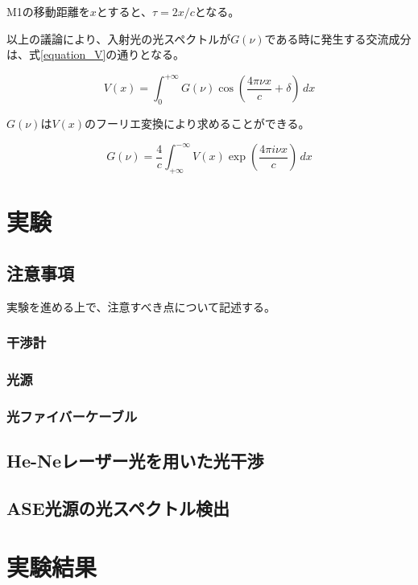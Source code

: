 \documentclass[uplatex, titlepage, fontsize=10pt, paper=a4paper]{jsarticle}
\numberwithin{equation}{section}
\begin{document}
M1の移動距離を$x$とすると、$\tau=2x/c$となる。

以上の議論により、入射光の光スペクトルが$G(\nu)$である時に発生する交流成分は、式\ref{equation_V}の通りとなる。

\begin{equation}
    V(x)=\int_{0}^{+\infty} G(\nu)\cos\left(\frac{4{\pi}{\nu}x}{c} + \delta\right) \,dx 
    \label{equation_V}
\end{equation}

$G(\nu)$は$V(x)$のフーリエ変換により求めることができる。

\begin{equation}
    G(\nu)=\frac{4}{c} \int_{+\infty}^{-\infty} V(x)\exp\left(\frac{4{\pi}i{\nu}x}{c}\right)  \,dx 
\end{equation}



\section{実験}

\subsection{注意事項}
実験を進める上で、注意すべき点について記述する。

\subsubsection{干渉計}


\subsubsection{光源}

\subsubsection{光ファイバーケーブル}

\subsection{He-Neレーザー光を用いた光干渉}

\subsection{ASE光源の光スペクトル検出}

\section{実験結果}
\end{document}
